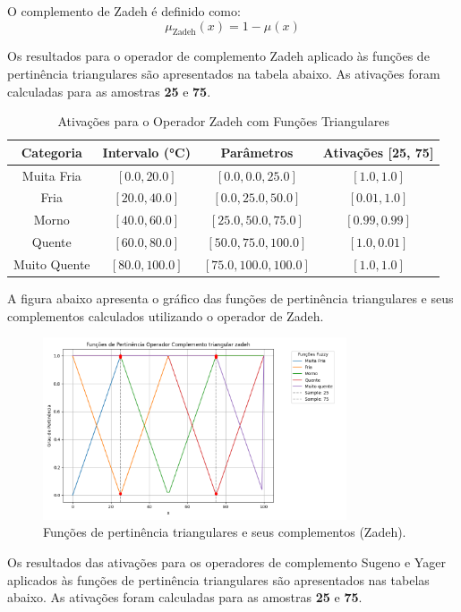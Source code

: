 \documentclass[a4paper,12pt]{article}
\begin{document}
O complemento de Zadeh é definido como:
\[
\mu_{\text{Zadeh}}(x) = 1 - \mu(x)
\]

Os resultados para o operador de complemento Zadeh aplicado às funções de pertinência triangulares são apresentados na tabela abaixo. As ativações foram calculadas para as amostras \textbf{25} e \textbf{75}.

\begin{table}[H]
\centering
\caption{Ativações para o Operador Zadeh com Funções Triangulares}
\begin{tabular}{|c|c|c|c|}
\hline
\textbf{Categoria}    & \textbf{Intervalo (°C)} & \textbf{Parâmetros}       & \textbf{Ativações [25, 75]} \\ \hline
Muita Fria            & $[0.0, 20.0]$          & $[0.0, 0.0, 25.0]$        & $[1.0, 1.0]$               \\ \hline
Fria                  & $[20.0, 40.0]$         & $[0.0, 25.0, 50.0]$       & $[0.01, 1.0]$              \\ \hline
Morno                 & $[40.0, 60.0]$         & $[25.0, 50.0, 75.0]$      & $[0.99, 0.99]$             \\ \hline
Quente                & $[60.0, 80.0]$         & $[50.0, 75.0, 100.0]$     & $[1.0, 0.01]$              \\ \hline
Muito Quente          & $[80.0, 100.0]$        & $[75.0, 100.0, 100.0]$    & $[1.0, 1.0]$               \\ \hline
\end{tabular}
\end{table}

A figura abaixo apresenta o gráfico das funções de pertinência triangulares e seus complementos calculados utilizando o operador de Zadeh.

\begin{figure}[H]
    \centering
    \includegraphics[width=0.8\textwidth]{img/funções_de_pertinência_operador_complemento_triangular_zadeh_fuzzificado.png}
    \caption{Funções de pertinência triangulares e seus complementos (Zadeh).}
    \label{fig:complemento_zadeh_triangular}
\end{figure}
Os resultados das ativações para os operadores de complemento Sugeno e Yager aplicados às funções de pertinência triangulares são apresentados nas tabelas abaixo. As ativações foram calculadas para as amostras \textbf{25} e \textbf{75}.
\end{document}
